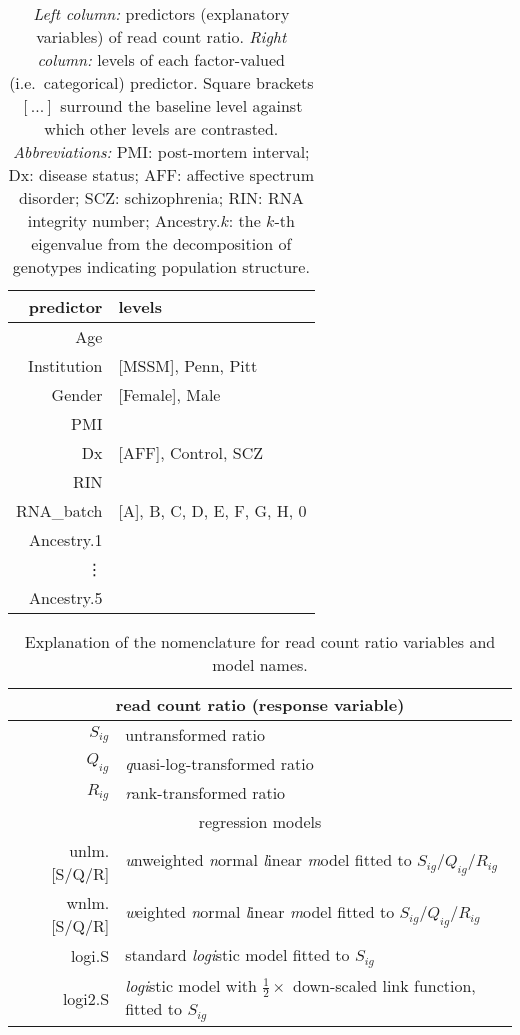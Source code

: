 \documentclass[12pt,letterpaper]{article}
\begin{document}
\begin{table}[h]
\begin{center}
\begin{tabular}{r|l}
predictor & levels\\
\hline
Age &  \\
Institution & [MSSM], Penn, Pitt\\
Gender & [Female], Male\\
PMI & \\
Dx & [AFF], Control, SCZ\\
RIN &  \\
RNA\_batch & [A], B, C, D, E, F, G, H, 0\\
Ancestry.1 & \\
\vdots & \\
Ancestry.5 &  \\
\end{tabular}
\caption{ \emph{Left column:} predictors (explanatory variables) of read count
ratio.  \emph{Right column:} levels of each factor-valued (i.e.~categorical)
predictor.  Square brackets \([...]\) surround the baseline level against
which other levels are contrasted.  \emph{Abbreviations:} PMI: post-mortem
interval; Dx: disease status; AFF: affective spectrum disorder; SCZ:
schizophrenia; RIN: RNA integrity number;
Ancestry.\(k\): the \(k\)-th eigenvalue from the decomposition of genotypes
indicating population structure.}
\label{tab:predictors}
\end{center}
\end{table}

\begin{table}
\begin{tabular}{r|l}
\multicolumn{2}{c}{read count ratio (response variable)} \\
\hline
\(S_{ig}\) & untransformed ratio \\
\(Q_{ig}\) & \emph{q}uasi-log-transformed ratio \\
\(R_{ig}\) & \emph{r}ank-transformed ratio \\
\hline
\multicolumn{2}{c}{regression models} \\
\hline
unlm.[S/Q/R] & \emph{u}nweighted \emph{n}ormal \emph{l}inear \emph{m}odel fitted to \(S_{ig}\)/\(Q_{ig}\)/\(R_{ig}\)\\
wnlm.[S/Q/R] & \emph{w}eighted \emph{n}ormal \emph{l}inear \emph{m}odel fitted to \(S_{ig}\)/\(Q_{ig}\)/\(R_{ig}\)\\
logi.S & standard \emph{logi}stic model fitted to \(S_{ig}\)\\
logi2.S & \emph{logi}stic model with \(\frac{1}{2}\times\) down-scaled link function, fitted to \(S_{ig}\) \\
\end{tabular}
\caption{Explanation of the nomenclature for read count ratio variables and
model names.}
\label{tab:model-names}
\end{table}
\end{document}
